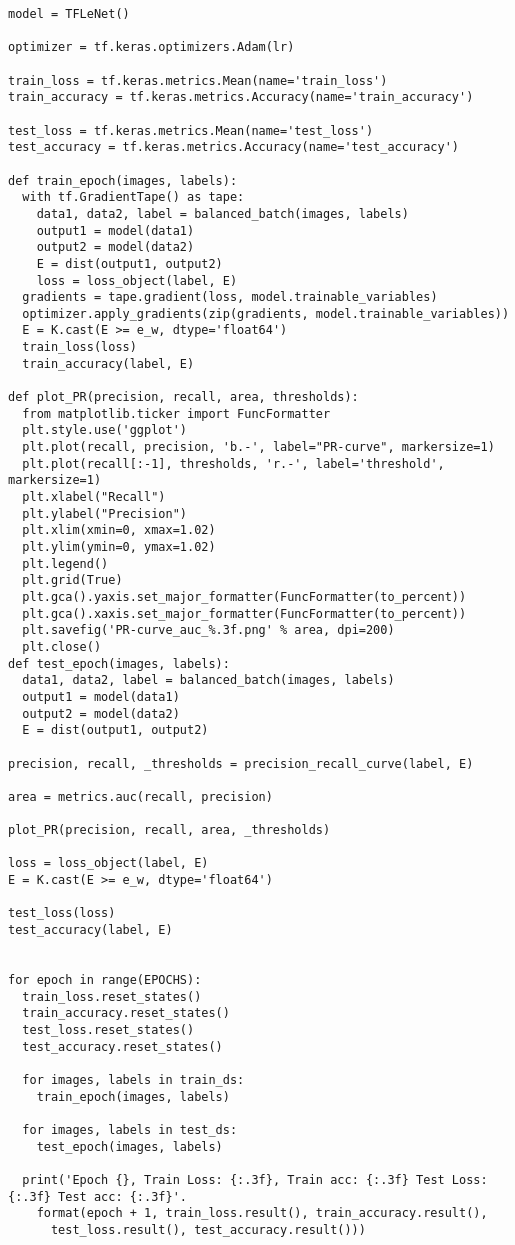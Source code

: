 \documentclass{article}
\begin{document}
\begin{lstlisting}
model = TFLeNet()

optimizer = tf.keras.optimizers.Adam(lr)

train_loss = tf.keras.metrics.Mean(name='train_loss')
train_accuracy = tf.keras.metrics.Accuracy(name='train_accuracy')

test_loss = tf.keras.metrics.Mean(name='test_loss')
test_accuracy = tf.keras.metrics.Accuracy(name='test_accuracy')

def train_epoch(images, labels):
  with tf.GradientTape() as tape:
    data1, data2, label = balanced_batch(images, labels)
    output1 = model(data1)
    output2 = model(data2)
    E = dist(output1, output2)
    loss = loss_object(label, E)
  gradients = tape.gradient(loss, model.trainable_variables)
  optimizer.apply_gradients(zip(gradients, model.trainable_variables))
  E = K.cast(E >= e_w, dtype='float64')
  train_loss(loss)
  train_accuracy(label, E)

def plot_PR(precision, recall, area, thresholds):
  from matplotlib.ticker import FuncFormatter
  plt.style.use('ggplot')
  plt.plot(recall, precision, 'b.-', label="PR-curve", markersize=1)
  plt.plot(recall[:-1], thresholds, 'r.-', label='threshold', markersize=1)
  plt.xlabel("Recall")
  plt.ylabel("Precision")
  plt.xlim(xmin=0, xmax=1.02)
  plt.ylim(ymin=0, ymax=1.02)
  plt.legend()
  plt.grid(True)
  plt.gca().yaxis.set_major_formatter(FuncFormatter(to_percent))
  plt.gca().xaxis.set_major_formatter(FuncFormatter(to_percent))
  plt.savefig('PR-curve_auc_%.3f.png' % area, dpi=200)
  plt.close()
def test_epoch(images, labels):
  data1, data2, label = balanced_batch(images, labels)
  output1 = model(data1)
  output2 = model(data2)
  E = dist(output1, output2)

precision, recall, _thresholds = precision_recall_curve(label, E)

area = metrics.auc(recall, precision)

plot_PR(precision, recall, area, _thresholds)

loss = loss_object(label, E)
E = K.cast(E >= e_w, dtype='float64')

test_loss(loss)
test_accuracy(label, E)


for epoch in range(EPOCHS):
  train_loss.reset_states()
  train_accuracy.reset_states()
  test_loss.reset_states()
  test_accuracy.reset_states()

  for images, labels in train_ds:
    train_epoch(images, labels)

  for images, labels in test_ds:
    test_epoch(images, labels)

  print('Epoch {}, Train Loss: {:.3f}, Train acc: {:.3f} Test Loss: {:.3f} Test acc: {:.3f}'.
    format(epoch + 1, train_loss.result(), train_accuracy.result(),
      test_loss.result(), test_accuracy.result()))

\end{lstlisting}
\end{document}
